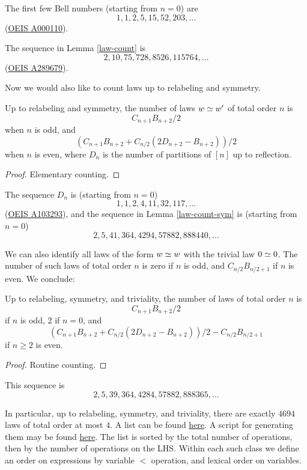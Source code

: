 The first few Bell numbers (starting from $n=0$) are
$$ 1, 1, 2, 5, 15, 52, 203, \dots$$
(\href{https://oeis.org/A000110}{OEIS A000110}).

The sequence in Lemma \ref{law-count} is
$$ 2, 10, 75, 728, 8526, 115764, \dots$$
(\href{https://oeis.org/A289679}{OEIS A289679}).

Now we would also like to count laws up to relabeling and symmetry.

\begin{lemma}\label{law-count-sym} Up to relabeling and symmetry, the number of laws $w \simeq w'$ of total order $n$ is
$$ C_{n+1} B_{n+2}/2$$
when $n$ is odd, and
$$ (C_{n+1} B_{n+2} + C_{n/2} (2D_{n+2} - B_{n+2}))/2$$
when $n$ is even, where $D_n$ is the number of partitions of $[n]$ up to reflection.
\end{lemma}

\begin{proof} Elementary counting.
\end{proof}

The sequence $D_n$ is (starting from $n=0$)
$$ 1, 1, 2, 4, 11, 32, 117, \dots$$
(\href{https://oeis.org/A103293}{OEIS A103293}), and the sequence in Lemma \ref{law-count-sym} is (starting from $n=0$)
$$ 2, 5, 41, 364, 4294, 57882, 888440, \dots$$

We can also identify all laws of the form $w \simeq w$ with the trivial law $0 \simeq 0$.  The number of such laws of total order $n$ is zero if $n$ is odd, and $C_{n/2} B_{n/2+1}$ if $n$ is even.  We conclude:

\begin{lemma}  Up to relabeling, symmetry, and triviality, the number of laws of total order $n$ is
$$ C_{n+1} B_{n+2}/2$$
if $n$ is odd, $2$ if $n = 0$, and
$$ (C_{n+1} B_{n+2} + C_{n/2} (2D_{n+2} - B_{n+2}))/2 - C_{n/2} B_{n/2+1}$$
if $n \geq 2$ is even.
\end{lemma}

\begin{proof} Routine counting.
\end{proof}

This sequence is
$$2, 5, 39, 364, 4284, 57882, 888365, \dots$$

In particular, up to relabeling, symmetry, and triviality, there are exactly $4694$ laws of total order at most $4$.  A list can be found \href{https://github.com/teorth/equational_theories/blob/main/data/equations.txt}{here}.  A script for generating them may be found \href{https://github.com/teorth/equational_theories/blob/main/scripts/generate_eqs_list.py}{here}.  The list is sorted by the total number of operations, then by the number of operations on the LHS. Within each such class we define an order on expressions by variable $<$ operation, and lexical order on variables.

